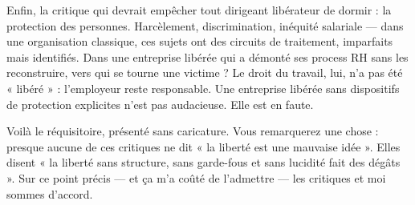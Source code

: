 Enfin, la critique qui devrait empêcher tout dirigeant libérateur de dormir : la protection des personnes. Harcèlement, discrimination, inéquité salariale — dans une organisation classique, ces sujets ont des circuits de traitement, imparfaits mais identifiés. Dans une entreprise libérée qui a démonté ses process RH sans les reconstruire, vers qui se tourne une victime ? Le droit du travail, lui, n'a pas été « libéré » : l'employeur reste responsable. Une entreprise libérée sans dispositifs de protection explicites n'est pas audacieuse. Elle est en faute.

Voilà le réquisitoire, présenté sans caricature. Vous remarquerez une chose : presque aucune de ces critiques ne dit « la liberté est une mauvaise idée ». Elles disent « la liberté sans structure, sans garde-fous et sans lucidité fait des dégâts ». Sur ce point précis — et ça m'a coûté de l'admettre — les critiques et moi sommes d'accord.
